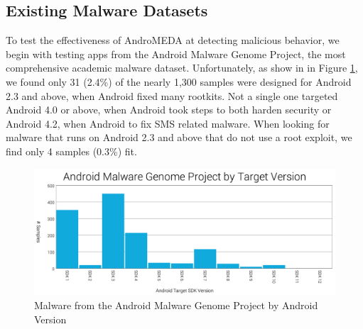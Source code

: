 \documentclass{acm_proc_article-sp}
\begin{document}
\subsection{Existing Malware Datasets}



To test the effectiveness of AndroMEDA at detecting malicious behavior, we begin with testing apps from the Android Malware Genome Project\citep{zhou2012dissecting}, the most comprehensive academic malware dataset. Unfortunately, as show in in Figure \ref{fig:malwaresdk}, we found only 31 (2.4\%) of the nearly 1,300 samples were designed for Android 2.3 and above, when Android fixed many rootkits. Not a single one targeted Android 4.0 or above, when Android took steps to both harden security or Android 4.2, when Android to fix SMS related malware\citep{androidjbsecurity}. When looking for malware that runs on Android 2.3 and above that do not use a root exploit, we find only 4 samples (0.3\%) fit. 

\begin{figure}[h]
\begin{center}
\includegraphics[width=1.0\columnwidth]{figs/MalwareAndSDK}
\caption{Malware from the Android Malware Genome Project by Android Version }
\label{fig:malwaresdk}
\end{center}
\end{figure}
\end{document}
